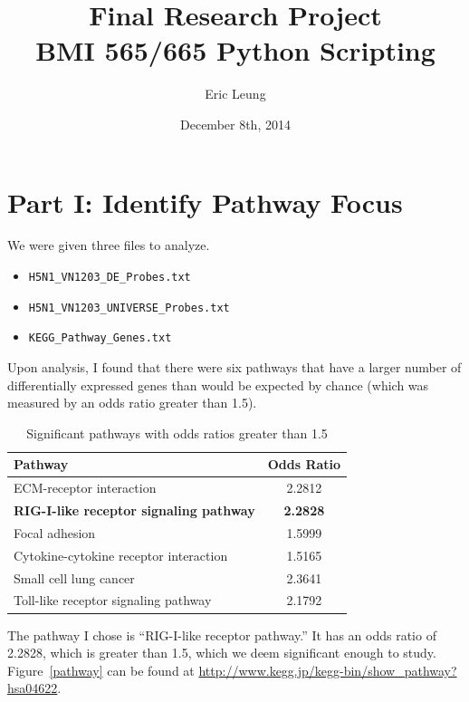 \documentclass[12pt, a4paper]{report}
\author{Eric Leung}
\title{Final Research Project \\
	BMI 565/665 Python Scripting}
\date{December 8th, 2014}
\begin{document}
\maketitle

\section*{Part I: Identify Pathway Focus}

We were given three files to analyze.
\begin{itemize}
\item \verb+H5N1_VN1203_DE_Probes.txt+
\item \verb+H5N1_VN1203_UNIVERSE_Probes.txt+
\item \verb+KEGG_Pathway_Genes.txt+
\end{itemize}

Upon analysis, I found that there were six pathways that have a larger number of differentially expressed genes than would be expected by chance (which was measured by an odds ratio greater than 1.5).

\begin{table}[ht]
\begin{center}
\begin{tabular}{lc}
    Pathway                                         & Odds Ratio 	  \\ \hline
    ECM-receptor interaction                        & 2.2812   		  \\
    \textbf{RIG-I-like receptor signaling pathway}  & \textbf{2.2828} \\
    Focal adhesion                                  & 1.5999     	  \\
    Cytokine-cytokine receptor interaction          & 1.5165     	  \\
    Small cell lung cancer                          & 2.3641    	  \\
    Toll-like receptor signaling pathway            & 2.1792    	  \\
\end{tabular}
\caption{Significant pathways with odds ratios greater than 1.5}
\end{center}
\end{table}

The pathway I chose is ``RIG-I-like receptor pathway.'' It has an odds ratio of 2.2828, which is greater than 1.5, which we deem significant enough to study. Figure~\ref{pathway} can be found at \url{http://www.kegg.jp/kegg-bin/show_pathway?hsa04622}.
\end{document}
